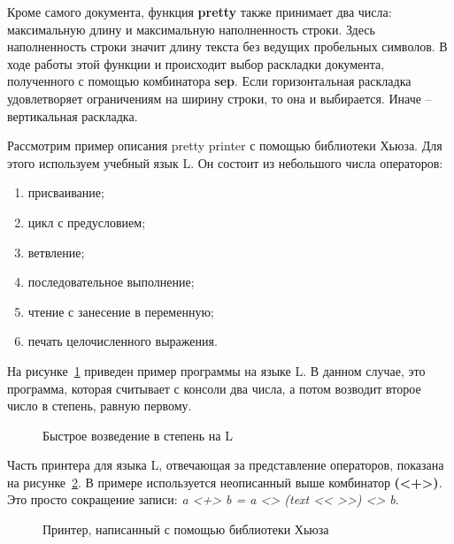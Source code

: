 

Кроме самого документа, функция \textbf{pretty} также принимает два числа: максимальную длину и максимальную наполненность строки. Здесь наполненность строки значит длину текста без ведущих пробельных символов. В ходе работы этой функции и происходит выбор раскладки документа, полученного с помощью комбинатора \textbf{sep}. Если горизонтальная раскладка удовлетворяет ограничениям на ширину строки, то она и выбирается. Иначе -- вертикальная раскладка.



Рассмотрим пример описания pretty printer с помощью библиотеки Хьюза. Для этого используем учебный язык L. Он состоит из небольшого числа операторов:
\begin{enumerate}
	\item присваивание;
	\item цикл с предусловием;
	\item ветвление;
	\item последовательное выполнение;
	\item чтение с занесение в переменную;
	\item печать целочисленного выражения.
\end{enumerate}

На рисунке~\ref{fig:lEx} приведен пример программы на языке L. В данном случае, это программа, которая считывает с консоли два числа, а потом возводит второе число в степень, равную первому.

\begin{figure}[h!]
	\centering
	
	\caption{Быстрое возведение в степень на L}
	\label{fig:lEx}
\end{figure}

Часть принтера для языка L, отвечающая за представление операторов, показана на рисунке~\ref{fig:lHughesPrinter}.
В примере используется неописанный выше комбинатор \textbf{(<+>)}. Это просто сокращение записи: \textit{a <+> b = a <> (text << >>) <> b}.
\begin{figure}[h!]
	
	\caption{Принтер, написанный с помощью библиотеки Хьюза}
	\label{fig:lHughesPrinter}
\end{figure}

